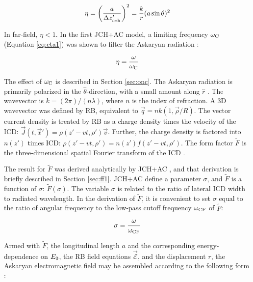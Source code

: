 \documentclass[amsmath,amssymb,aps,prd,10pt,twocolumn]{revtex4}
\begin{document}
\begin{equation}
\eta = \left( \frac{a}{\Delta z'_{\rm coh}} \right)^2 = \frac{k}{r} (a\sin\theta)^2
\end{equation}

In far-field, $\eta<1$.  In the first JCH+AC model, a limiting frequency $\omega_{\rm C}$ (Equation \ref{eq:eta1}) was shown to filter the Askaryan radiation \cite{10.1016/j.astropartphys.2017.03.008}:

\begin{equation}
\eta = \frac{\omega}{\omega_{\rm C}}
\label{eq:eta1}
\end{equation}

The effect of $\omega_{\rm C}$ is described in Section \ref{sec:onc}. The Askaryan radiation is primarily polarized in the $\hat{\theta}$-direction, with a small amount along $\hat{r}$ \cite{10.1016/j.astropartphys.2017.03.008,10.1103/physrevd.84.103003}.  The wavevector is $k = (2\pi)/(n\lambda)$, where $n$ is the index of refraction.  A 3D wavevector was defined by RB, equivalent to $\vec{q} = nk(1, \vec{\rho}/R)$.  The vector current density is treated by RB as a charge density times the velocity of the ICD: $\vec{J}(t,\vec{x}') = \rho(z'-vt,\rho') \vec{v}$.  Further, the charge density is factored into $n(z')$ times ICD: $\rho(z'-vt,\rho') = n(z') f(z'-vt,\rho')$.  The form factor $\widetilde{F}$ is the three-dimensional spatial Fourier transform of the ICD \cite{10.1103/physrevd.65.016003}.

The result for $\widetilde{F}$ was derived analytically by JCH+AC \cite{10.1016/j.astropartphys.2017.03.008}, and that derivation is briefly described in Section \ref{sec:ff1}.  JCH+AC define a parameter $\sigma$, and $\widetilde{F}$ is a function of $\sigma$: $\widetilde{F}(\sigma)$.  The variable $\sigma$ is related to the ratio of lateral ICD width to radiated wavelength.  In the derivation of $\widetilde{F}$, it is convenient to set $\sigma$ equal to the ratio of angular frequency to the low-pass cutoff frequency $\omega_{\rm CF}$ of $\widetilde{F}$:

\begin{equation}
\sigma = \frac{\omega}{\omega_{\rm CF}} \label{eq:sigma_0}
\end{equation}

Armed with $\widetilde{F}$, the longitudinal length $a$ and the corresponding energy-dependence on $E_{\rm 0}$, the RB field equations $\vec{\mathcal{E}}$, and the displacement $r$, the Askaryan electromagnetic field may be assembled according to the following form \cite{10.1103/physrevd.65.016003}:
\end{document}
